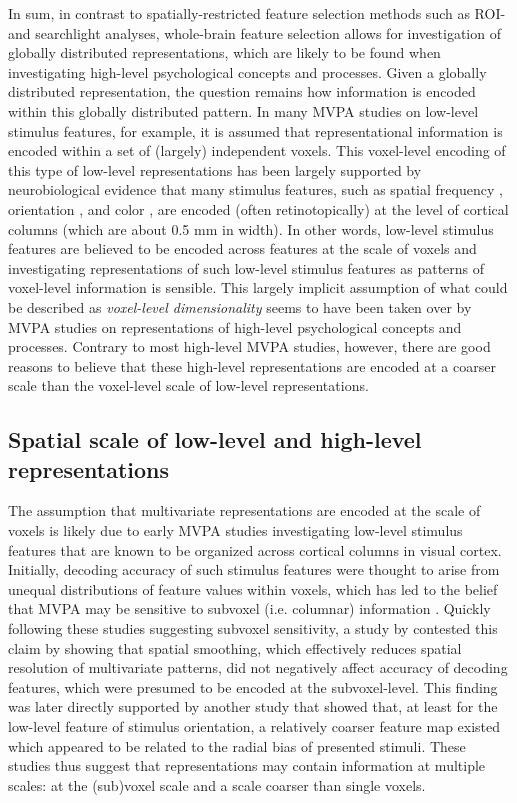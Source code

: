 \documentclass[jou,12pt,a4paper]{apa6}
\begin{document}
In sum, in contrast to spatially-restricted feature selection methods such as ROI- and searchlight analyses, whole-brain feature selection allows for investigation of globally distributed representations, which are likely to be found when investigating high-level psychological concepts and processes. Given a globally distributed representation, the question remains how information is encoded within this globally distributed pattern. In many MVPA studies on low-level stimulus features, for example, it is assumed that representational information is encoded within a set of (largely) independent voxels. This voxel-level encoding of this type of low-level representations has been largely supported by neurobiological evidence that many stimulus features, such as spatial frequency \cite{tootell1981}, orientation \cite{yacoub2008}, and color \cite{hadjikhani1998}, are encoded (often retinotopically) at the level of cortical columns (which are about 0.5 mm in width). In other words, low-level stimulus features are believed to be encoded across features at the scale of voxels and investigating representations of such low-level stimulus features as patterns of voxel-level information is sensible. This largely implicit assumption of what could be described as \emph{voxel-level dimensionality} seems to have been taken over by MVPA studies on representations of high-level psychological concepts and processes. Contrary to most high-level MVPA studies, however, there are good reasons to believe that these high-level representations are encoded at a coarser scale than the voxel-level scale of low-level representations.

\subsection{Spatial scale of low-level and high-level representations}
\noindent The assumption that multivariate representations are encoded at the scale of voxels is likely due to early MVPA studies investigating low-level stimulus features that are known to be organized across cortical columns in visual cortex. Initially, decoding accuracy of such stimulus features were thought to arise from unequal distributions of feature values within voxels, which has led to the belief that MVPA may be sensitive to subvoxel (i.e. columnar) information \cite{haynes2005,kamitani2005}. Quickly following these studies suggesting subvoxel sensitivity, a study by  contested this claim by showing that spatial smoothing, which effectively reduces spatial resolution of multivariate patterns, did not negatively affect accuracy of decoding features, which were presumed to be encoded at the subvoxel-level. This finding was later directly supported by another study \cite{freeman2011} that showed that, at least for the low-level feature of stimulus orientation, a relatively coarser feature map existed which appeared to be related to the radial bias of presented stimuli. These studies thus suggest that representations may contain information at multiple scales: at the (sub)voxel scale and a scale coarser than single voxels.
\end{document}
